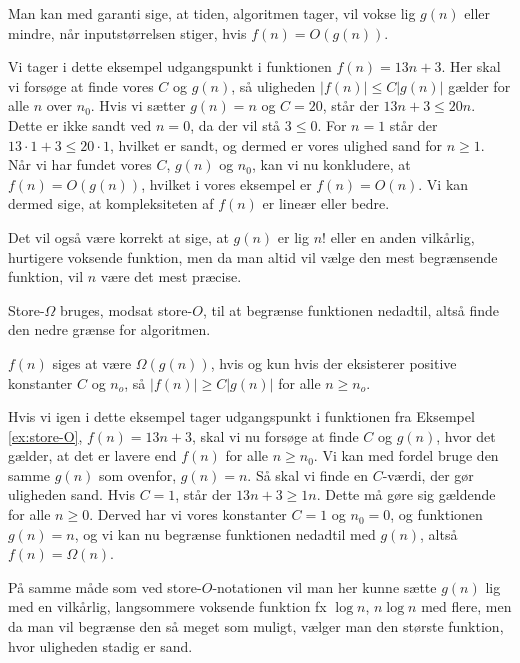 Man kan med garanti sige, at tiden, algoritmen tager, vil vokse lig $g(n)$ eller mindre, når inputstørrelsen stiger, hvis $f(n)=O(g(n))$.

\begin{exmp} \label{ex:store-O}
Vi tager i dette eksempel udgangspunkt i funktionen $f(n)=13n+3$. 
Her skal vi forsøge at finde vores $C$ og $g(n)$, så uligheden $|f(n)| \leq C|g(n)|$ gælder for alle $n$ over $n_0$. Hvis vi sætter $g(n) = n$ og $C=20$, står der $13n+3 \leq 20n$. Dette er ikke sandt ved $n=0$, da der vil stå $3 \leq 0$. For $n=1$ står der $13\cdot 1 + 3 \leq 20 \cdot 1$, hvilket er sandt, og dermed er vores ulighed sand for $n \geq 1$.
Når vi har fundet vores $C$, $g(n)$ og $n_0$, kan vi nu konkludere, at $f(n) = O(g(n))$, hvilket i vores eksempel er $f(n) = O(n)$.
Vi kan dermed sige, at kompleksiteten af $f(n)$ er lineær eller bedre.
\end{exmp}
Det vil også være korrekt at sige, at $g(n)$ er lig $n!$ eller en anden vilkårlig, hurtigere voksende funktion, men da man altid vil vælge den mest begrænsende funktion, vil $n$ være det mest præcise. 

Store-$\Omega$ bruges, modsat store-$O$, til at begrænse funktionen nedadtil, altså finde den nedre grænse for algoritmen.
\begin{defn}
$f(n)$ siges at være  $\Omega(g(n))$, hvis og kun hvis der eksisterer positive konstanter $C$ og $n_o$, så $|f(n)| \geq C |g(n)|$ for alle $n \geq n_o$.
\end{defn}

\begin{exmp}
Hvis vi igen i dette eksempel tager udgangspunkt i funktionen fra Eksempel \ref{ex:store-O}, $f(n)=13n+3$, skal vi nu forsøge at finde $C$ og $g(n)$, hvor det gælder, at det er lavere end $f(n)$ for alle $n \geq n_0$. 
Vi kan med fordel bruge den samme $g(n)$ som ovenfor, $g(n)=n$. Så skal vi finde en $C$-værdi, der gør uligheden sand. Hvis $C=1$, står der $13n+3 \geq 1n$. Dette må gøre sig gældende for alle $n \geq 0$. Derved har vi vores konstanter $C=1$ og $n_0 = 0$, og funktionen $g(n)=n$, og vi kan nu begrænse funktionen nedadtil med $g(n)$, altså $f(n)=\Omega(n)$.
\end{exmp}

På samme måde som ved store-$O$-notationen vil man her kunne sætte $g(n)$ lig med en vilkårlig, langsommere voksende funktion fx $\log n$, $n \log n$ med flere, men da man vil begrænse den så meget som muligt, vælger man den største funktion, hvor uligheden stadig er sand.


